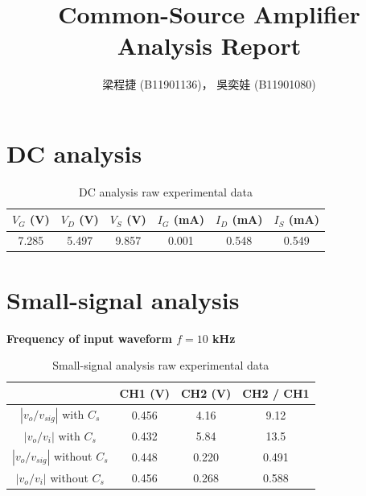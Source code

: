 \documentclass{article}
\title{Common-Source Amplifier Analysis Report}
\author{梁程捷 (B11901136)， 吳奕娃 (B11901080)}
\date{}
\begin{document}
\begin{CJK*}{UTF8}{bkai}

\maketitle

\section*{DC analysis}
\begin{table}[H]
    \begin{center}
    \begin{tabular}{|c|c|c||c|c|c|}
        \hline
        $V_G$ (V)& $V_D$ (V) & $V_S$ (V)& $I_G$ (\unit{\milli\ampere}) & $I_D$ (\unit{\milli\ampere})& $I_S$ (\unit{\milli\ampere})\\ 
        \hline\hline
        7.285   & 5.497 & 9.857 & 0.001 & 0.548 & 0.549 \\

     \hline
    \end{tabular}
    \caption{DC analysis raw experimental data}
    \end{center}
\end{table}

\section*{Small-signal analysis}
\textbf{Frequency of input waveform $ f = 10$ \unit{\kilo\hertz}}\\
\begin{table}[H]
    \begin{center}
    \begin{tabular}{|c|c|c|c|}
        \hline
            & CH1 (V) & CH2 (V) & CH2 / CH1\\ 
        \hline\hline
        $\left\lvert v_o/v_{sig} \right\rvert$  with $C_s$ & 0.456 & 4.16 & 9.12     \\
        $\left\lvert v_o/v_{i} \right\rvert$  with $C_s$ & 0.432 & 5.84 & 13.5     \\
        $\left\lvert v_o/v_{sig} \right\rvert$  without $C_s$ &0.448 & 0.220 & 0.491   \\
        $\left\lvert v_o/v_{i} \right\rvert$  without $C_s$ &0.456 & 0.268 & 0.588   \\

     \hline
    \end{tabular}
    \caption{Small-signal analysis raw experimental data}
    \end{center}
\end{table}


\end{CJK*}
\end{document}
